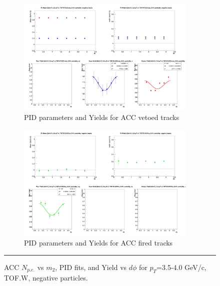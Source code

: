 \begin{figure}[H]
  \ContinuedFloat
    \begin{subfigure}{1\textwidth}
   \centering
   \includegraphics[width=0.94\textwidth]{hiptfits/neg/fitParams_tof2_cent0_ch0_pT-35-40.jpg}
    \caption{PID parameters and Yields for ACC vetoed tracks}
    \end{subfigure}    
    \begin{subfigure}{1\textwidth}
   \centering
   \includegraphics[width=0.94\textwidth]{hiptfits/neg/fitParams_tof3_cent0_ch0_pT-35-40.jpg}
    \caption{PID parameters and Yields for ACC fired tracks}
    \end{subfigure} 
    \rule{35em}{0.5pt}
  \caption[ACC $N_{p.e.}$ vs $m_2$, PID fits, and Yield vs $d\phi$ for $p_T$=3.5-4.0 GeV/c, TOF.W, negative particles.]{ACC $N_{p.e.}$ vs $m_2$, PID fits, and Yield vs $d\phi$ for $p_T$=3.5-4.0 GeV/c, TOF.W, negative particles.}
  \label{fig:acc35-40neg}
\end{figure}

